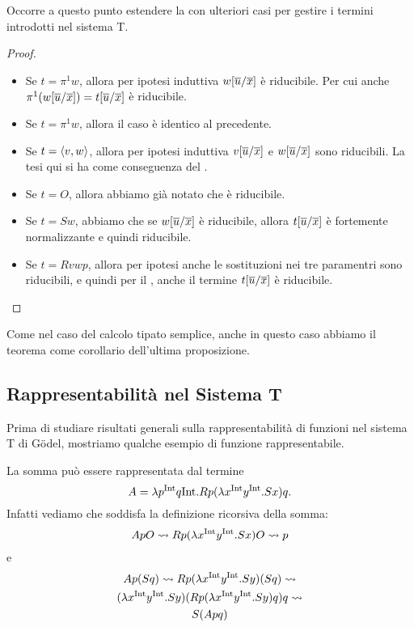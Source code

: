 \documentclass[]{marticle}
\begin{document}
Occorre a questo punto estendere la  con ulteriori casi per
gestire i termini introdotti nel sistema T.

\begin{proof}
    \begin{itemize}
        \item Se $t = \pi^1 w$, allora per ipotesi induttiva
            $w[\overline{u}/\overline{x}]$ \`e riducibile. Per cui anche 
            $\pi^1 (w[\overline{u}/\overline{x}]) = t [\overline{u}/\overline{x}]$ \`e riducibile.
        \item Se $t = \pi^1 w$, allora il caso \`e identico al precedente.
        \item Se $t = \langle v,w \rangle$, allora per ipotesi induttiva
            $v[\overline{u}/\overline{x}]$ e $w[\overline{u}/\overline{x}]$ sono riducibili. La tesi qui si ha come conseguenza
            del .
        \item Se $t=O$, allora abbiamo gi\`a notato che \`e riducibile.
        \item Se $t = Sw$, abbiamo che se $w[\overline{u}/\overline{x}]$
            \`e riducibile, allora $t[\overline{u}/\overline{x}]$ \`e
            fortemente normalizzante e quindi riducibile.
        \item Se $t = Rvwp$, allora per ipotesi anche le sostituzioni nei tre
            paramentri sono riducibili, e quindi per il , anche il
            termine $t[\overline{u}/\overline{x}]$ \`e riducibile.
    \end{itemize}
\end{proof}

Come nel caso del calcolo tipato semplice, anche in questo caso abbiamo il
teorema come corollario dell'ultima proposizione.

\subsection{Rappresentabilit\`a nel Sistema T}

Prima di studiare risultati generali sulla rappresentabilit\`a di funzioni nel
sistema T di G\"odel, mostriamo qualche esempio di funzione rappresentabile.

La somma pu\`o essere rappresentata dal termine
\[
    A = \lambda p^{\text{Int}} q\text{Int}. Rp (\lambda x^{\text{Int}} y^{\text{Int}}. Sx) q.
\]
Infatti vediamo che soddisfa la definizione ricorsiva della somma:
\begin{gather*}
    ApO \rightsquigarrow R p (\lambda x^{\text{Int}} y^{\text{Int}}. Sx) O \rightsquigarrow p
\end{gather*}
e 
\begin{gather*}
    Ap(Sq) \rightsquigarrow R p (\lambda x^{\text{Int}} y^{\text{Int}}. Sy) (Sq) \rightsquigarrow \\ (\lambda x^{\text{Int}} y^{\text{Int}}.
    Sy)(R p (\lambda x^{\text{Int}} y^{\text{Int}}. Sy) q) q \rightsquigarrow \\
    S (A pq)
\end{gather*}
\end{document}
